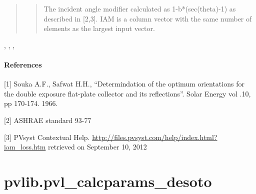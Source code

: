 \documentclass[letterpaper,10pt,english]{sphinxmanual}
\begin{document}
\begin{fulllineitems}
\begin{quote}
\begin{description}
\begin{quote}
The incident angle modifier calculated as 1-b*(sec(theta)-1) as
described in {[}2,3{]}. IAM is a column vector with the same number of 
elements as the largest input vector.
\end{quote}

\end{description}\end{quote}




{\hyperref[stubs/pvlib.pvl_getaoi:pvlib.pvl_getaoi]{}}, {\hyperref[stubs/pvlib.pvl_ephemeris:pvlib.pvl_ephemeris]{}}, {\hyperref[stubs/pvlib.pvl_spa:pvlib.pvl_spa]{}}, {\hyperref[stubs/pvlib.pvl_physicaliam:pvlib.pvl_physicaliam]{}}


\paragraph{References}

{[}1{]} Souka A.F., Safwat H.H., ``Determindation of the optimum orientations
for the double exposure flat-plate collector and its reflections''.
Solar Energy vol .10, pp 170-174. 1966.

{[}2{]} ASHRAE standard 93-77

{[}3{]} PVsyst Contextual Help. 
\href{http://files.pvsyst.com/help/index.html?iam\_loss.htm}{http://files.pvsyst.com/help/index.html?iam\_loss.htm} retrieved on
September 10, 2012

\end{fulllineitems}



\section{pvlib.pvl\_calcparams\_desoto}
\label{stubs/pvlib.pvl_calcparams_desoto:pvlib-pvl-calcparams-desoto}\label{stubs/pvlib.pvl_calcparams_desoto::doc}
\end{document}
